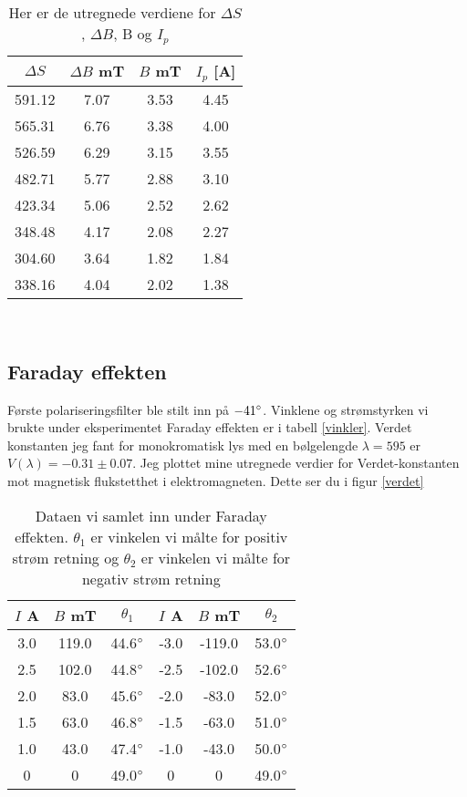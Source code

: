 \documentclass[norsk,a4paper,12pt]{article}
\begin{document}
\begin{table}[!h]
\centering
\caption[Utregnede verdier for $\Delta S$, $\Delta B$, B og I]{Her er de utregnede verdiene for $\Delta S$, $\Delta B$, B og $I_p$}
	\begin{tabular}{| c | c | c | c |}
	\hline
	$\Delta S$ & $\Delta B$ mT & $B$ mT & $I_p$ [A]\\ 
	\hline
	591.12 & 7.07 & 3.53 & 4.45\\
	565.31 & 6.76 & 3.38 & 4.00\\
	526.59 & 6.29 & 3.15 & 3.55\\
	482.71 & 5.77 & 2.88 & 3.10\\
	423.34 & 5.06 & 2.52 & 2.62\\
	348.48 & 4.17 & 2.08 & 2.27\\
	304.60 & 3.64 & 1.82 & 1.84\\
	338.16 & 4.04 & 2.02 & 1.38\\
	\hline
	\end{tabular}\\
\label{uthyst}
\end{table}


\subsection{Faraday effekten}
Første polariseringsfilter ble stilt inn på $-41\degree$. Vinklene og strømstyrken vi brukte under eksperimentet Faraday effekten er i tabell \vref{vinkler}. Verdet konstanten jeg fant for monokromatisk lys med en bølgelengde $\lambda = 595$ er $V(\lambda) = -0.31 \pm 0.07$. Jeg plottet mine utregnede verdier for Verdet-konstanten mot magnetisk flukstetthet i elektromagneten. Dette ser du i figur \vref{verdet}
\begin{table}[h!]
\centering
\caption[Rådata for Faraday effekten]{Dataen vi samlet inn under Faraday effekten. $\theta_1$ er vinkelen vi målte for positiv strøm retning og $\theta_2$ er vinkelen vi målte for negativ strøm retning}
	\begin{tabular}{| c | c | c | c | c | c |}
	\hline
	$I$ A & $B$ mT & $\theta_1$ & $I$ A &$B$ mT& $\theta_2$ \\ 
	\hline
	3.0 & 119.0 & 44.6$\degree$ & -3.0 & -119.0 & 53.0$\degree$\\
	2.5 & 102.0 & 44.8$\degree$ & -2.5 & -102.0 & 52.6$\degree$\\
	2.0 & 83.0 & 45.6$\degree$ & -2.0 & -83.0 & 52.0$\degree$\\
	1.5 & 63.0 & 46.8$\degree$ & -1.5 & -63.0 & 51.0$\degree$\\
	1.0 & 43.0 & 47.4$\degree$ & -1.0 & -43.0 & 50.0$\degree$\\
	0 & 0 & 49.0$\degree$ & 0 & 0 & 49.0$\degree$\\
	\hline
	\end{tabular}\\
\label{vinkler}
\end{table}
\end{document}
